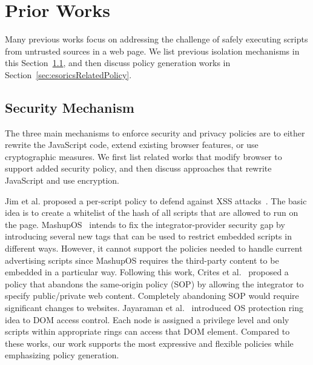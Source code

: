 \section{Prior Works}
\label{sec:esorics_related_works}

Many previous works focus on addressing the challenge of safely executing scripts from untrusted sources in a web page.  We list previous isolation mechanisms in this Section~\ref{sec:esoricsRelatedMech}, and then discuss policy generation works in Section~\ref{sec:esoricsRelatedPolicy}.

\subsection{Security Mechanism}\label{sec:esoricsRelatedMech}  The three main mechanisms to enforce security and privacy policies are to either rewrite the JavaScript code, extend existing browser features, or use cryptographic measures.  We first list related works that modify browser to support added security policy, and then discuss approaches that rewrite JavaScript and use encryption.

  Jim et al. proposed a per-script policy to defend against XSS attacks~\cite{Beep}. The basic idea is to create a whitelist of the hash of all scripts that are allowed to run on the page.  MashupOS~\cite{MashupOS} intends to fix the integrator-provider security gap by introducing several new tags that can be used to restrict embedded scripts in different ways.  However, it cannot support the policies needed to handle current advertising scripts since MashupOS requires the third-party content to be embedded in a particular way.  Following this work, Crites et al.~\cite{OMash} proposed a policy that abandons the same-origin policy (SOP) by allowing the integrator to specify public/private web content.  Completely abandoning SOP would require significant changes to websites.  Jayaraman et al.~\cite{escudo} introduced OS protection ring idea to DOM access control.  Each node is assigned a privilege level and only scripts within appropriate rings can access that DOM element.  Compared to these works, our work supports the most expressive and flexible policies while emphasizing policy generation.

\renewcommand{\thefootnote}{$\star$} 


